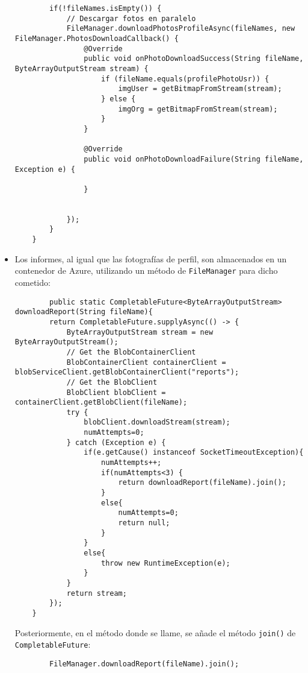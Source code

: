 \begin{itemize}
\begin{lstlisting}
        if(!fileNames.isEmpty()) {
            // Descargar fotos en paralelo
            FileManager.downloadPhotosProfileAsync(fileNames, new FileManager.PhotosDownloadCallback() {
                @Override
                public void onPhotoDownloadSuccess(String fileName, ByteArrayOutputStream stream) {
                    if (fileName.equals(profilePhotoUsr)) {
                        imgUser = getBitmapFromStream(stream);
                    } else {
                        imgOrg = getBitmapFromStream(stream);
                    }
                }

                @Override
                public void onPhotoDownloadFailure(String fileName, Exception e) {

                }


            });
        }
    }
    \end{lstlisting}
    \item Los informes, al igual que las fotografías de perfil, son almacenados en un contenedor de Azure, utilizando un método de \texttt{FileManager} para dicho cometido:
    \begin{lstlisting}
        public static CompletableFuture<ByteArrayOutputStream> downloadReport(String fileName){
        return CompletableFuture.supplyAsync(() -> {
            ByteArrayOutputStream stream = new ByteArrayOutputStream();
            // Get the BlobContainerClient
            BlobContainerClient containerClient = blobServiceClient.getBlobContainerClient("reports");
            // Get the BlobClient
            BlobClient blobClient = containerClient.getBlobClient(fileName);
            try {
                blobClient.downloadStream(stream);
                numAttempts=0;
            } catch (Exception e) {
                if(e.getCause() instanceof SocketTimeoutException){
                    numAttempts++;
                    if(numAttempts<3) {
                        return downloadReport(fileName).join();
                    }
                    else{
                        numAttempts=0;
                        return null;
                    }
                }
                else{
                    throw new RuntimeException(e);
                }
            }
            return stream;
        });
    }
    \end{lstlisting}
    Posteriormente, en el método donde se llame, se añade el método \texttt{join()} de \texttt{CompletableFuture}:
    \begin{lstlisting}
        FileManager.downloadReport(fileName).join();

\end{lstlisting}
\end{itemize}
